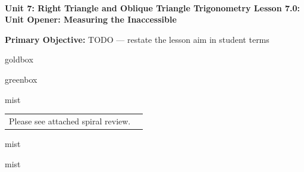 \documentclass[10pt]{article}
\newcommand{\UnitNumberName}{Unit 7: Right Triangle and Oblique Triangle Trigonometry \quad}
\newcommand{\LessonNumberName}{Lesson 7.0: Unit Opener: Measuring the Inaccessible}
\begin{document}
\begin{center}
    {\Large\bfseries \CourseName \\
    {\small\bfseries \UnitNumberName \LessonNumberName}}
\end{center}

\begin{tcolorbox}[colback=mist, colframe=royal, boxrule=0.9pt, arc=2mm,
    left=2mm, right=2mm, top=1.5mm, bottom=1.5mm]
    \textbf{Primary Objective:} TODO --- restate the lesson aim in student terms
\end{tcolorbox}

\renewcommand{\arraystretch}{1.6}
\begin{skillbox}{goldbox}
\end{skillbox}

\begin{skillbox}{greenbox}
\end{skillbox}

\begin{fixedskillbox}{mist}
    \begin{tabularx}{\linewidth}{@{}X c@{}}
        \begin{minipage}[t]{0.55\linewidth}\vspace{0pt}
            Please see attached spiral review.  %
        \end{minipage}
        &
        \begin{minipage}[t]{0.38\linewidth}\vspace{0pt}\centering
        \end{minipage}
    \end{tabularx}
\end{fixedskillbox}

\begin{skillbox}[Hook]{mist}
\end{skillbox}

\begin{skillbox}[Lesson]{mist}
\end{skillbox}
\end{document}
